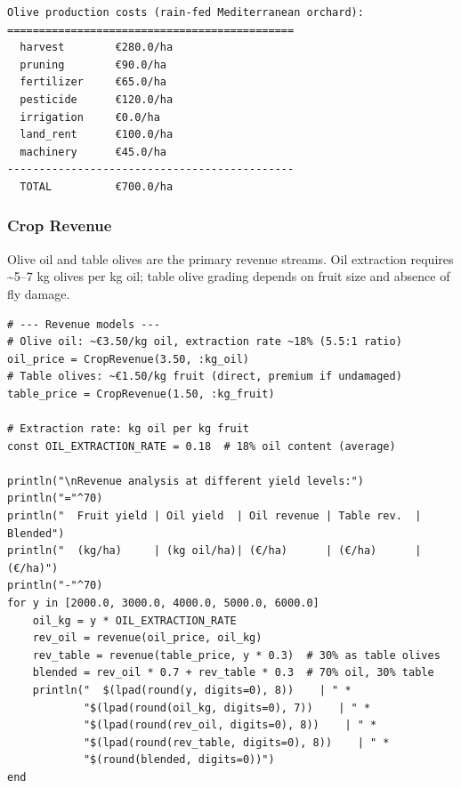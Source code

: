 \begin{verbatim}
Olive production costs (rain-fed Mediterranean orchard):
=============================================
  harvest        €280.0/ha
  pruning        €90.0/ha
  fertilizer     €65.0/ha
  pesticide      €120.0/ha
  irrigation     €0.0/ha
  land_rent      €100.0/ha
  machinery      €45.0/ha
---------------------------------------------
  TOTAL          €700.0/ha
\end{verbatim}



\subsubsection{Crop Revenue}



\label{3579691832625988567}{}


Olive oil and table olives are the primary revenue streams. Oil extraction requires {\textasciitilde}5–7 kg olives per kg oil; table olive grading depends on fruit size and absence of fly damage.




\begin{verbatim}
# --- Revenue models ---
# Olive oil: ~€3.50/kg oil, extraction rate ~18% (5.5:1 ratio)
oil_price = CropRevenue(3.50, :kg_oil)
# Table olives: ~€1.50/kg fruit (direct, premium if undamaged)
table_price = CropRevenue(1.50, :kg_fruit)

# Extraction rate: kg oil per kg fruit
const OIL_EXTRACTION_RATE = 0.18  # 18% oil content (average)

println("\nRevenue analysis at different yield levels:")
println("="^70)
println("  Fruit yield | Oil yield  | Oil revenue | Table rev.  | Blended")
println("  (kg/ha)     | (kg oil/ha)| (€/ha)      | (€/ha)      | (€/ha)")
println("-"^70)
for y in [2000.0, 3000.0, 4000.0, 5000.0, 6000.0]
    oil_kg = y * OIL_EXTRACTION_RATE
    rev_oil = revenue(oil_price, oil_kg)
    rev_table = revenue(table_price, y * 0.3)  # 30% as table olives
    blended = rev_oil * 0.7 + rev_table * 0.3  # 70% oil, 30% table
    println("  $(lpad(round(y, digits=0), 8))    | " *
            "$(lpad(round(oil_kg, digits=0), 7))    | " *
            "$(lpad(round(rev_oil, digits=0), 8))    | " *
            "$(lpad(round(rev_table, digits=0), 8))    | " *
            "$(round(blended, digits=0))")
end
\end{verbatim}




